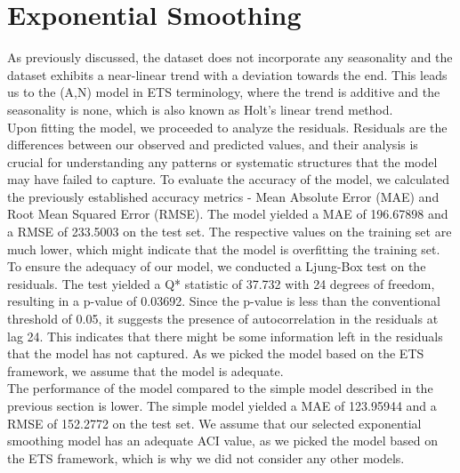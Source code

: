 \section{Exponential Smoothing}\label{sec:exponential-smoothing}

As previously discussed, the dataset does not incorporate any seasonality and the dataset exhibits a near-linear
trend with a deviation towards the end.
This leads us to the (A,N) model in ETS terminology, where the trend is additive and the seasonality
is none, which is also known as Holt's linear trend method.\\

Upon fitting the model, we proceeded to analyze the residuals.
Residuals are the differences between our observed and predicted values, and their analysis is crucial for
understanding any patterns or systematic structures that the model may have failed to capture.
To evaluate the accuracy of the model, we calculated the previously established accuracy metrics -
Mean Absolute Error (MAE) and Root Mean Squared Error (RMSE).
The model yielded a MAE of 196.67898 and a RMSE of 233.5003 on the test set.
The respective values on the training set are much lower, which might indicate that the model is overfitting the training set.\\

To ensure the adequacy of our model, we conducted a Ljung-Box test on the residuals.
The test yielded a Q* statistic of 37.732 with 24 degrees of freedom, resulting in a p-value of 0.03692.
Since the p-value is less than the conventional threshold of 0.05, it suggests the presence of autocorrelation in the residuals at lag 24.
This indicates that there might be some information left in the residuals that the model has not captured.
As we picked the model based on the ETS framework, we assume that the model is adequate.\\

The performance of the model compared to the simple model described in the previous section is lower.
The simple model yielded a MAE of 123.95944 and a RMSE of 152.2772 on the test set.
We assume that our selected exponential smoothing model has an adequate ACI value, as we picked the model
based on the ETS framework, which is why we did not consider any other models.
